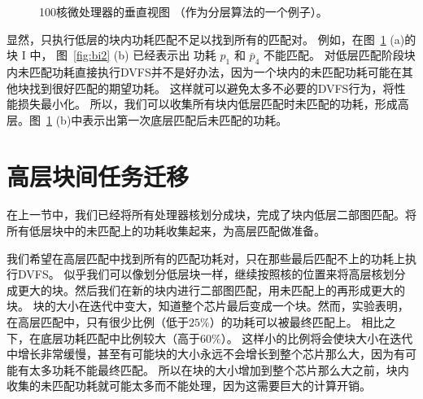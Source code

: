 \begin{figure}[H]
  \centering
  \caption{100核微处理器的垂直视图 （作为分层算法的一个例子）。}\label{fig:cpu_partition}
\end{figure}

显然，只执行低层的块内功耗匹配不足以找到所有的匹配对。
例如，在图~\ref{fig:cpu_partition} (a)的块 I 中， 图~\ref{fig:bi2} (b) 已经表示出
功耗 $p_1$ 和 $\bar{p}_4$ 不能匹配。
对低层匹配阶段块内未匹配功耗直接执行DVFS并不是好办法，因为一个块内的未匹配功耗可能在其他块找到很好匹配的期望功耗。
这样就可以避免太多不必要的DVFS行为，将性能损失最小化。
所以，我们可以收集所有块内低层匹配时未匹配的功耗，形成高层。图~\ref{fig:cpu_partition} (b)中表示出第一次底层匹配后未匹配的功耗。

\section{高层块间任务迁移}\label{sec:fm}

在上一节中，我们已经将所有处理器核划分成块，完成了块内低层二部图匹配。将所有低层块中的未匹配上的功耗收集起来，为高层匹配做准备。

我们希望在高层匹配中找到所有的匹配功耗对，只在那些最后匹配不上的功耗上执行DVFS。
似乎我们可以像划分低层块一样，继续按照核的位置来将高层核划分成更大的块。然后我们在新的块内进行二部图匹配，用未匹配上的再形成更大的块。
块的大小在迭代中变大，知道整个芯片最后变成一个块。然而，实验表明，在高层匹配中，只有很少比例（低于$25\%$）的功耗可以被最终匹配上。
相比之下，在底层功耗匹配中比例较大（高于$60\%$）。
这样小的比例将会使块大小在迭代中增长非常缓慢，甚至有可能块的大小永远不会增长到整个芯片那么大，因为有可能有太多功耗不能最终匹配。
所以在块的大小增加到整个芯片那么大之前，块内收集的未匹配功耗就可能太多而不能处理，因为这需要巨大的计算开销。

